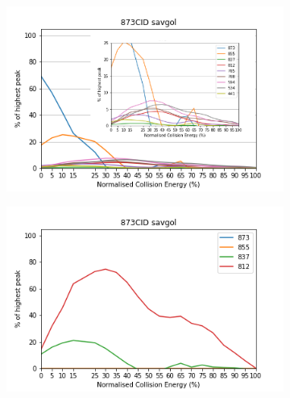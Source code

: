 \begin{figure}[htbp]
  \begin{subfigure}[b]{0.5\textwidth}
    \includegraphics[width=\textwidth, height=\textwidth]{figures/Kapitel4/Kataboliten/diags/873CID-savgol1.png}
    \caption{}
    \label{fig:873MKLeafspraydiags1}
  \end{subfigure}
  \hfill
  \begin{subfigure}[b]{0.5\textwidth}
    \includegraphics[width=\textwidth, height=\textwidth]{figures/Kapitel4/Kataboliten/diags/873CID-savgol2.png}
    \caption{}
    \label{fig:873MKstructurediags2}
  \end{subfigure}
  

\end{figure}

